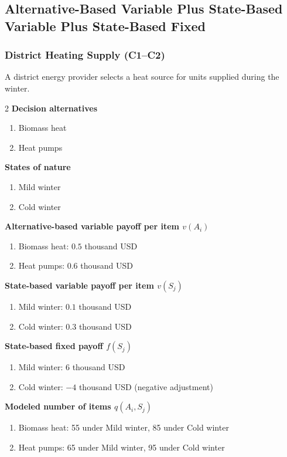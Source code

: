 	\subsection{Alternative-Based Variable Plus State-Based Variable Plus State-Based Fixed}
	\label{sec:alternative-based-variable-payoff-plus-state-based-variable-payoff-plus-state-based-fixed-payoff}


	\subsubsection{District Heating Supply (C1--C2)}
	\label{sec:problem28-district-heating-supply-c1-c2}
	A district energy provider selects a heat source for units supplied during the winter.
	\begin{multicols}{2}
	\textbf{Decision alternatives}
	\begin{enumerate}[label=\arabic*.]
\item Biomass heat
\item Heat pumps
	\end{enumerate}
	\textbf{States of nature}
	\begin{enumerate}[label=\arabic*.]
\item Mild winter
\item Cold winter
	\end{enumerate}
	\columnbreak
	\textbf{Alternative-based variable payoff per item $v(A_i)$}
\begin{enumerate}[label=\arabic*.]
\item Biomass heat: $0.5$ thousand USD
\item Heat pumps: $0.6$ thousand USD\end{enumerate}
\textbf{State-based variable payoff per item $v(S_j)$}
\begin{enumerate}[label=\arabic*.]
\item Mild winter: $0.1$ thousand USD
\item Cold winter: $0.3$ thousand USD\end{enumerate}
\textbf{State-based fixed payoff $f(S_j)$}
\begin{enumerate}[label=\arabic*.]
\item Mild winter: $6$ thousand USD
\item Cold winter: $-4$ thousand USD (negative adjustment)\end{enumerate}
\textbf{Modeled number of items $q(A_i,S_j)$}
\begin{enumerate}[label=\arabic*.]
\item Biomass heat: 55 under Mild winter, 85 under Cold winter
\item Heat pumps: 65 under Mild winter, 95 under Cold winter
\end{enumerate}
	\end{multicols}

